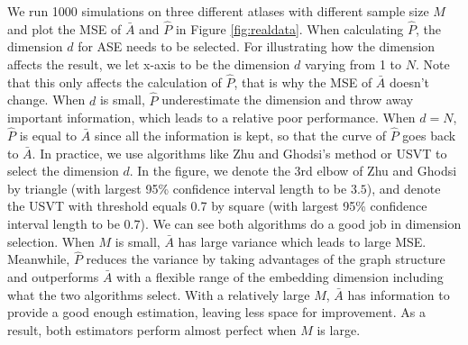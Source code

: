 \documentclass[a4paper]{article}
\begin{document}
We run 1000 simulations on three different atlases with different sample size $M$ and plot the MSE of $\bar{A}$ and $\hat{P}$ in Figure \ref{fig:realdata}. When calculating $\hat{P}$, the dimension $d$ for ASE needs to be selected. For illustrating how the dimension affects the result, we let x-axis to be the dimension $d$ varying from 1 to $N$. Note that this only affects the calculation of $\hat{P}$, that is why the MSE of $\bar{A}$ doesn't change. When $d$ is small, $\hat{P}$ underestimate the dimension and throw away important information, which leads to a relative poor performance. When $d=N$, $\hat{P}$ is equal to $\bar{A}$ since all the information is kept, so that the curve of $\hat{P}$ goes back to $\bar{A}$. In practice, we use algorithms like Zhu and Ghodsi's method or USVT to select the dimension $d$. In the figure, we denote the 3rd elbow of Zhu and Ghodsi by triangle (with largest 95\% confidence interval length to be $3.5$), and denote the USVT with threshold equals 0.7 by square (with largest 95\% confidence interval length to be $0.7$). We can see both algorithms do a good job in dimension selection. When $M$ is small, $\bar{A}$ has large variance which leads to large MSE. Meanwhile, $\hat{P}$ reduces the variance by taking advantages of the graph structure and outperforms $\bar{A}$ with a flexible range of the embedding dimension including what the two algorithms select. With a relatively large $M$, $\bar{A}$ has information to provide a good enough estimation, leaving less space for improvement. As a result, both estimators perform almost perfect when $M$ is large.
\end{document}
